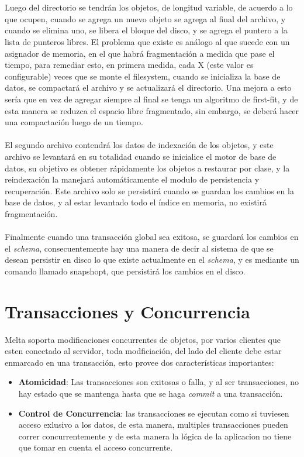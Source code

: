 \documentclass{melta}
\begin{document}
\\\\
Luego del directorio se tendrán los objetos, de longitud variable, de acuerdo a lo que ocupen, cuando se agrega un nuevo objeto se agrega al final del archivo, y cuando se elimina uno, se libera el bloque del disco, y se agrega el puntero a la lista de punteros libres. El problema que existe es análogo al que sucede con un asignador de memoria, en el que habrá fragmentación a medida que pase el tiempo, para remediar esto, en primera medida, cada X (este valor es configurable) veces que se monte el filesystem, cuando se inicializa la base de datos, se compactará el archivo y se actualizará el directorio. Una mejora a esto sería que en vez de agregar siempre al final se tenga un algoritmo de first-fit, y de esta manera se reduzca el espacio libre fragmentado, sin embargo, se deberá hacer una compactación luego de un tiempo. 
\\\\
El segundo archivo contendrá los datos de indexación de los objetos, y este archivo se levantará en su totalidad cuando se inicialice el motor de base de datos, su objetivo es obtener rápidamente los objetos a restaurar por clase, y la reindexación la manejará automáticamente el modulo de persistencia y recuperación. Este archivo solo se persistirá cuando se guardan los cambios en la base de datos, y al estar levantado todo el índice en memoria, no existirá fragmentación.
\\\\
Finalmente cuando una transacción global sea exitosa, se guardará los cambios en el \textit{schema}, consecuentemente hay una manera de decir al sistema de que se desean persistir en disco lo que existe actualmente en el \textit{schema}, y es mediante un comando llamado snapshopt, que persistirá los cambios en el disco. 

\section{Transacciones y Concurrencia}
\label{sec:tran}
Melta soporta modificaciones concurrentes de objetos, por varios clientes que esten conectado al servidor, toda modficiación, del lado del cliente debe estar enmarcado en una transacción, esto provee dos características importantes:

\begin{itemize}
\item \textbf{Atomicidad}: Las transacciones son exitosas o falla, y al ser transacciones, no hay estado que se mantenga hasta que se haga \textit{commit} a una transacción.
\item \textbf{Control de Concurrencia}: las transacciones se ejecutan como si tuviesen acceso exlusivo a los datos, de esta manera, multiples transacciones pueden correr concurrentemente y de esta manera la lógica de la aplicacion no tiene que tomar en cuenta el acceso concurrente.
\end{itemize}
\end{document}
